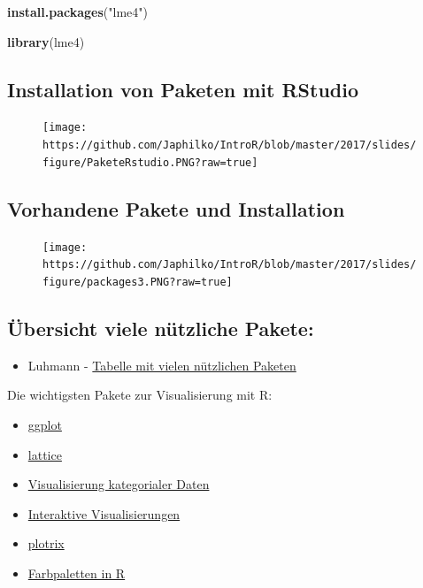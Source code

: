\documentclass[]{article}
\newenvironment{Shaded}{\begin{snugshade}}{\end{snugshade}}
\newcommand{\KeywordTok}[1]{\textcolor[rgb]{0.13,0.29,0.53}{\textbf{{#1}}}}
\newcommand{\StringTok}[1]{\textcolor[rgb]{0.31,0.60,0.02}{{#1}}}
\newcommand{\NormalTok}[1]{{#1}}
\providecommand{\tightlist}{%
  \setlength{\itemsep}{0pt}\setlength{\parskip}{0pt}}
\begin{document}
\begin{Shaded}
\begin{Highlighting}[]
\KeywordTok{install.packages}\NormalTok{(}\StringTok{"lme4"}\NormalTok{)}

\KeywordTok{library}\NormalTok{(lme4)}
\end{Highlighting}
\end{Shaded}

\subsection{Installation von Paketen mit
RStudio}\label{installation-von-paketen-mit-rstudio}

\begin{figure}[htbp]
\centering
\texttt{[image: https://github.com/Japhilko/IntroR/blob/master/2017/slides/figure/PaketeRstudio.PNG?raw=true]}
\caption{}
\end{figure}

\subsection{Vorhandene Pakete und
Installation}\label{vorhandene-pakete-und-installation}

\begin{figure}[htbp]
\centering
\texttt{[image: https://github.com/Japhilko/IntroR/blob/master/2017/slides/figure/packages3.PNG?raw=true]}
\caption{}
\end{figure}

\subsection{Übersicht viele nützliche
Pakete:}\label{ubersicht-viele-nutzliche-pakete}

\begin{itemize}
\tightlist
\item
  Luhmann -
  \href{http://www.beltz.de/fileadmin/beltz/downloads/OnlinematerialienPVU/28090_Luhmann/Verwendete\%20Pakete.pdf}{Tabelle
  mit vielen nützlichen Paketen}
\end{itemize}

Die wichtigsten Pakete zur Visualisierung mit R:

\begin{itemize}
\tightlist
\item
  \href{http://ggplot2.org/}{ggplot}
\item
  \href{http://lattice.r-forge.r-project.org/Vignettes/src/lattice-intro/lattice-intro.pdf}{lattice}
\item
  \href{http://www.statmethods.net/advgraphs/mosaic.html}{Visualisierung
  kategorialer Daten}
\item
  \href{http://cran.r-project.org/web/packages/googleVis/vignettes/googleVis_examples.html}{Interaktive
  Visualisierungen}
\item
  \href{http://www.inside-r.org/packages/cran/plotrix/docs/draw.circle}{plotrix}
\item
  \href{http://cran.r-project.org/web/packages/colorspace/vignettes/hcl-colors.pdf}{Farbpaletten
  in R}
\end{itemize}
\end{document}
